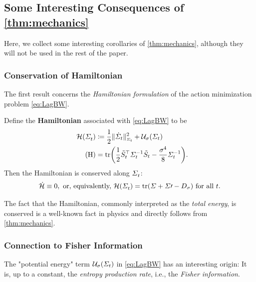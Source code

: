 \subsection{Some Interesting Consequences of \cref{thm:mechanics}}
\label{sec:interesting}

Here, we collect some interesting corollaries of \cref{thm:mechanics}, although they will not be used in the rest of the paper.

\subsubsection{Conservation of Hamiltonian}
The first result concerns the \emph{Hamiltonian formulation} of the action minimization problem \eqref{eq:LagBW}. 
 
\newcommand{\hambase}{ \mathcal{H} }
\newcommand{\ham}[1][\Sigmasol]{ \hambase\parens*{#1} }

\begin{corollary}
Define the \textbf{Hamiltonian} associated with \eqref{eq:LagBW} to be
\begin{align}
\nn
\ham &\defeq \kenergyBW + \penergyBW \\
\label{eq:HamBW}
\tag{H}
&=  \tr  \parens*{\frac{1}{2} \Ht^\top\Sigmasolinv\Ht - \frac{\sdev^4}{8} \Sigmasolinv}.
\end{align}Then the Hamiltonian is conserved along $\Sigma^{}_{ t }$: 
\begin{align}
\dot{\hambase} \equiv 0,  \text{ or, equivalently, }  \ham = \tr \parens*{\Sigma + \Sigma\prime - \D} \textup{ for all $\ctime$.}
\end{align}
\end{corollary}

The fact that the Hamiltonian, commonly interpreted as the \emph{total energy}, is conserved is a well-known fact in physics \citep{villani2009optimal} and directly follows from \cref{thm:mechanics}.

\subsubsection{Connection to Fisher Information}

The "potential energy" term $\penergyBW$ in \eqref{eq:LagBW} has an interesting origin: It is, up to a constant, the \emph{entropy production rate}, i.e., the \emph{Fisher information}.


